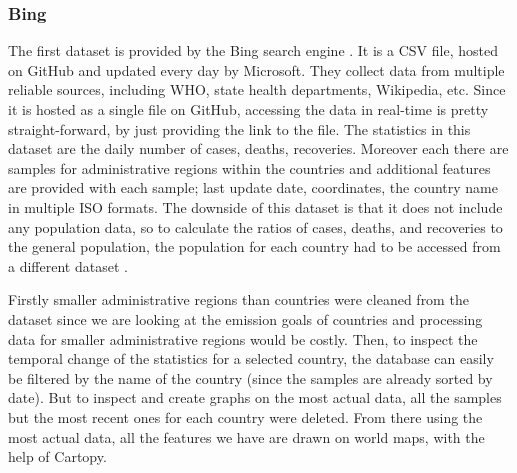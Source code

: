 \subsubsection{Bing}
The first dataset is provided by the Bing search engine \cite{Bing}. It is a CSV file, hosted on GitHub and updated every day by Microsoft. They collect data from multiple reliable sources, including WHO, state health departments, Wikipedia, etc.
Since it is hosted as a single file on GitHub, accessing the data in real-time is pretty straight-forward, by just providing the link to the file. The statistics in this dataset are the daily number of cases, deaths, recoveries. Moreover each there are samples for administrative regions within the countries and additional features are provided with each sample; last update date, coordinates, the country name in multiple ISO formats. The downside of this dataset is that it does not include any population data, so to calculate the ratios of
cases, deaths, and recoveries to the general population, the population for each country had to be accessed from a different dataset \cite{PopulationData}.

Firstly smaller administrative regions than countries were cleaned from the dataset since we are looking at the emission goals of countries and processing data for smaller administrative regions would be costly.
Then, to inspect the temporal change of the statistics for a selected country, the database can easily be filtered by the name of the country (since the samples are already sorted by date). But to inspect and create graphs on the most actual data,
all the samples but the most recent ones for each country were deleted. From there using the most actual data, all the features we have are drawn on world maps, with the help of Cartopy\cite{Cartopy}.


